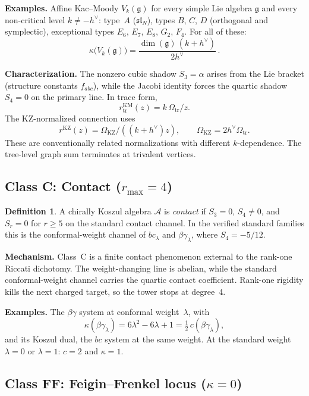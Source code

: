 \documentclass[11pt]{article}
\theoremstyle{plain}
\theoremstyle{definition}
\newtheorem{definition}[theorem]{Definition}
\theoremstyle{remark}
\providecommand{\fg}{\mathfrak{g}}
\providecommand{\cA}{\mathcal{A}}
\begin{document}
\noindent\textbf{Examples.} Affine Kac--Moody $V_k(\fg)$ for every
simple Lie algebra $\fg$ and every non-critical level
$k \neq -h^\vee$: type~$A$ ($\mathfrak{sl}_N$),
types $B$, $C$, $D$ (orthogonal and symplectic),
exceptional types $E_6$, $E_7$, $E_8$, $G_2$, $F_4$.
For all of these:
\[
\kappa\bigl(V_k(\fg)\bigr)
= \frac{\dim(\fg)\,(k + h^\vee)}{2h^\vee}\,.
\]

\noindent\textbf{Characterization.}
The nonzero cubic shadow $S_3 = \alpha$ arises from the Lie bracket
(structure constants $f_{abc}$), while the Jacobi identity forces the
quartic shadow $S_4 = 0$ on the primary line. In trace form,
\[
r^{\mathrm{KM}}_{\mathrm{tr}}(z)=k\,\Omega_{\mathrm{tr}}/z .
\]
The KZ-normalized connection uses
\[
r^{\mathrm{KZ}}(z)
=\Omega_{\mathrm{KZ}}/((k+h^\vee)z),
\qquad
\Omega_{\mathrm{KZ}}=2h^\vee\Omega_{\mathrm{tr}}.
\]
These are conventionally related normalizations with different
$k$-dependence. The tree-level graph sum terminates at trivalent
vertices.

\medskip

\subsection{Class C: Contact ($r_{\max} = 4$)}

\begin{definition}\label{def:class-C}
A chirally Koszul algebra $\cA$ is \emph{contact} if
$S_3=0$, $S_4\neq0$, and $S_r=0$ for $r\geq5$ on the standard
contact channel. In the verified standard families this is the
conformal-weight channel of $bc_\lambda$ and
$\beta\gamma_\lambda$, where $S_4=-5/12$.
\end{definition}

\noindent\textbf{Mechanism.}
Class~C is a finite contact phenomenon external to the rank-one
Riccati dichotomy. The weight-changing line is abelian, while the
standard conformal-weight channel carries the quartic contact
coefficient. Rank-one rigidity kills the next charged target, so the
tower stops at degree~$4$.

\noindent\textbf{Examples.}
The $\beta\gamma$ system at conformal weight~$\lambda$, with
\[
\kappa(\beta\gamma_\lambda)
= 6\lambda^2 - 6\lambda + 1
= \tfrac{1}{2}\,c(\beta\gamma_\lambda),
\]
and its Koszul dual, the $bc$ system at the same weight.
At the standard weight $\lambda = 0$ or $\lambda = 1$:
$c = 2$ and $\kappa = 1$.

\medskip

\subsection{Class FF: Feigin--Frenkel locus ($\kappa = 0$)}
\label{ssec:class-FF}
\end{document}
